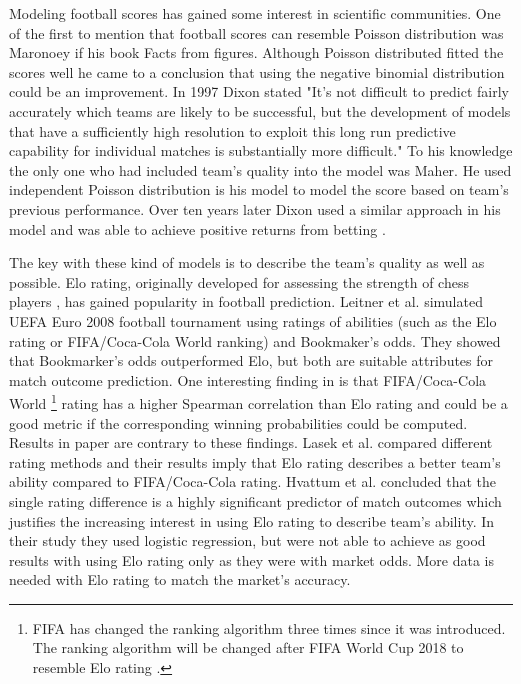 Modeling football scores has gained some interest in scientific communities. One of the first to mention that football scores can resemble Poisson distribution was Maronoey if his book Facts from figures. Although Poisson distributed fitted the scores well he came to a conclusion that using the negative binomial distribution could be an improvement.\cite{moroney1962facts}
In 1997 Dixon stated \cite{dixon1997} "It's not difficult to predict fairly accurately which teams are likely to be successful, but the development of models that have a sufficiently high resolution to exploit this long run predictive capability for individual matches is substantially more difficult." To his knowledge the only one who had included team's quality into the model was Maher. He used independent Poisson distribution is his model to model the score based on team's previous performance. \cite{maher1982modelling} Over ten years later Dixon used a similar approach in his model and was able to achieve positive returns from betting \cite{dixon1997}.

The key with these kind of models is to describe the team's quality as well as possible. Elo rating, originally developed for assessing the strength of chess players \cite{elo1978rating}, has gained popularity in football prediction. Leitner et al. \cite{leitner2010forecasting} simulated UEFA Euro 2008 football tournament using ratings of abilities (such as the Elo rating or FIFA/Coca-Cola World ranking) and Bookmaker's odds. They showed that Bookmarker's odds outperformed Elo, but both are suitable attributes for match outcome prediction. One interesting finding in \cite{leitner2010forecasting} is that FIFA/Coca-Cola World \footnote{FIFA has changed the ranking algorithm three times since it was introduced. The ranking algorithm will be changed after FIFA World Cup 2018 to resemble Elo rating \cite{wiki:fifarating}.} rating has a higher Spearman correlation than Elo rating and could be a good metric if the corresponding winning probabilities could be computed. Results in paper \cite{lasek2013predictive} are contrary to these findings. Lasek et al. \cite{lasek2013predictive} compared different rating methods and their results imply that Elo rating describes a better team's ability compared to FIFA/Coca-Cola rating. Hvattum et al. \cite{hvattum2010using} concluded that the single rating difference is a highly significant predictor of match outcomes which justifies the increasing interest in using Elo rating to describe team's ability. In their study they used logistic regression, but were not able to achieve as good results with using Elo rating only as they were with market odds. More data is needed with Elo rating to match the market's accuracy.

